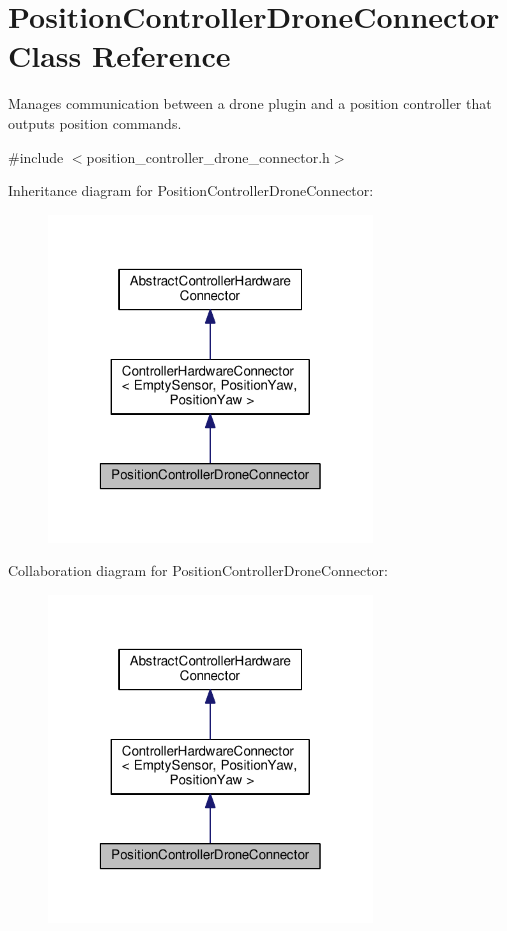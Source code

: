 \hypertarget{classPositionControllerDroneConnector}{\section{Position\-Controller\-Drone\-Connector Class Reference}
\label{classPositionControllerDroneConnector}
}


Manages communication between a drone plugin and a position controller that outputs position commands.  




{\ttfamily \#include $<$position\-\_\-controller\-\_\-drone\-\_\-connector.\-h$>$}



Inheritance diagram for Position\-Controller\-Drone\-Connector\-:\nopagebreak
\begin{figure}[H]
\begin{center}
\leavevmode
\includegraphics[width=244pt]{classPositionControllerDroneConnector__inherit__graph}
\end{center}
\end{figure}


Collaboration diagram for Position\-Controller\-Drone\-Connector\-:\nopagebreak
\begin{figure}[H]
\begin{center}
\leavevmode
\includegraphics[width=244pt]{classPositionControllerDroneConnector__coll__graph}
\end{center}
\end{figure}
